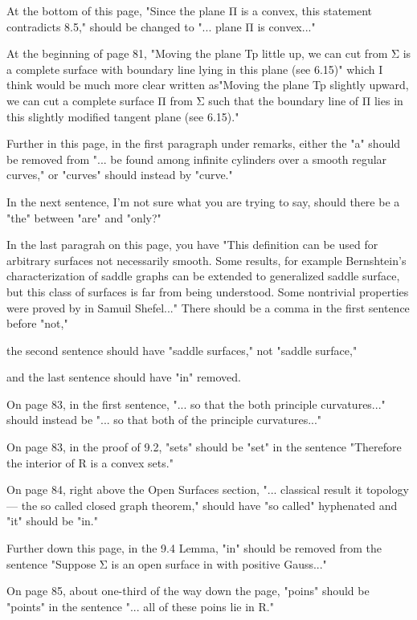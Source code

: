  At the bottom of this page, "Since the plane Π is a convex, this statement contradicts 8.5," should be changed to "... plane Π is convex..." 
 
 At the beginning of page 81, "Moving the plane Tp little up, we can cut from Σ is a complete surface with boundary line lying in this plane (see 6.15)" which I think would be much more clear written as"Moving the plane Tp slightly upward, we can cut a complete surface  Π  from Σ such that the boundary line of Π lies in this slightly modified tangent plane (see 6.15)." 
 
 Further in this page, in the first paragraph under remarks, either the "a" should be removed from "... be found among infinite cylinders over a smooth regular curves," or "curves" should instead by "curve." 
 
 In the next sentence, I'm not sure what you are trying to say, should there be a "the" between "are" and "only?"
 
 In the last paragrah on this page, you have "This definition can be used for arbitrary surfaces not necessarily smooth. Some results, for example Bernshtein’s characterization of saddle graphs can be extended to generalized saddle surface, but this class of surfaces is far from being understood. Some nontrivial properties were proved by in Samuil Shefel..." There should be a comma in the first sentence before "not,"
 
 the second sentence should have "saddle surfaces," not "saddle surface," 
 
 and the last sentence should have "in" removed. 
 
 On page 83, in the first sentence, "...  so that the both principle curvatures..." should instead be "... so that both of the principle curvatures..." 
 
 On page 83, in the proof of 9.2, "sets" should be "set" in the sentence "Therefore the interior of R is a convex sets." 
 
 On page 84, right above the Open Surfaces section, "... classical result it topology — the so called closed graph theorem," should have "so called" hyphenated and "it" should be "in." 
 
 Further down this page, in the 9.4 Lemma, "in" should be removed from the sentence "Suppose Σ is an open surface in with positive Gauss..." 
 
 On page 85, about one-third of the way down the page, "poins" should be "points" in the sentence "... all of these poins lie in R." 
 
